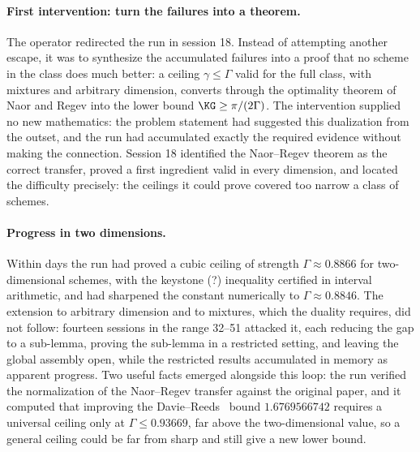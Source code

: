 \paragraph{First intervention: turn the failures into a theorem.}
The operator redirected the run in session 18. Instead of attempting another
escape, it was to synthesize the accumulated failures into a proof that no
scheme in the class does much better: a ceiling $\gamma\le\Gamma$ valid for
the full class, with mixtures and arbitrary dimension, converts through the
optimality theorem of Naor and Regev \cite{naor2014krivine} into the lower
bound $\KG\ge\pi/(2\Gamma)$. The intervention supplied no new mathematics:
the problem statement had suggested this dualization from the outset, and
the run had accumulated exactly the required evidence without making the
connection. Session 18 identified the Naor--Regev theorem as the correct
transfer, proved a first ingredient valid in every dimension, and located
the difficulty precisely: the ceilings it could prove covered too narrow a
class of schemes.

\paragraph{Progress in two dimensions.}
Within days the run had proved a cubic ceiling of strength
$\Gamma\approx0.8866$ for two-dimensional schemes, with the {\color{red}keystone (?)}
inequality certified in interval arithmetic, and had sharpened the
constant numerically to $\Gamma\approx0.8846$. The extension to arbitrary dimension and to mixtures, which the
duality requires, did not follow: fourteen sessions in the range 32--51
attacked it, each reducing the gap to a sub-lemma, proving the sub-lemma in
a restricted setting, and leaving the global assembly open, while the
restricted results accumulated in memory as apparent progress. Two useful
facts emerged alongside this loop: the run verified the normalization of the
Naor--Regev transfer against the original paper, and it computed that
improving the Davie--Reeds~\cite{Davie1984LowerBoundKG,Reeds1991LowerBoundKG} bound $1.6769566742$ requires a universal ceiling
only at $\Gamma\le0.93669$, far above the two-dimensional value, so a
general ceiling could be far from sharp and still give a new lower bound.

